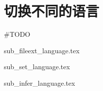 \section {切换不同的语言}

\#TODO

{sub_fileext_language.tex}

{sub_set_language.tex}

{sub_infer_language.tex}
